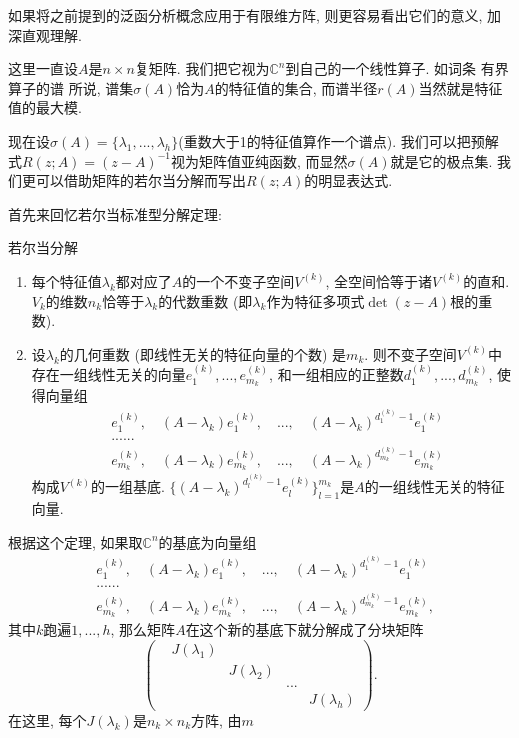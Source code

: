 

如果将之前提到的泛函分析概念应用于有限维方阵, 则更容易看出它们的意义, 加深直观理解. 

这里一直设$A$是$n\times n$复矩阵. 我们把它视为$\mathbb{C}^n$到自己的一个线性算子. 如词条 有界算子的谱 所说, 谱集$\sigma(A)$恰为$A$的特征值的集合, 而谱半径$r(A)$当然就是特征值的最大模. 

现在设$\sigma(A)=\{\lambda_1,...,\lambda_h\}$(重数大于1的特征值算作一个谱点). 我们可以把预解式$R(z;A)=(z-A)^{-1}$视为矩阵值亚纯函数, 而显然$\sigma(A)$就是它的极点集. 我们更可以借助矩阵的若尔当分解而写出$R(z;A)$的明显表达式. 

首先来回忆若尔当标准型分解定理:

\begin{theorem}{若尔当分解}
\begin{enumerate}
\item 每个特征值$\lambda_k$都对应了$A$的一个不变子空间$V^{(k)}$, 全空间恰等于诸$V^{(k)}$的直和. $V_k$的维数$n_k$恰等于$\lambda_k$的代数重数 (即$\lambda_k$作为特征多项式$\det(z-A)$根的重数).
\item 设$\lambda_k$的几何重数 (即线性无关的特征向量的个数) 是$m_k$. 则不变子空间$V^{(k)}$中存在一组线性无关的向量$e^{(k)}_1,...,e^{(k)}_{m_k}$, 和一组相应的正整数$d^{(k)}_1,...,d^{(k)}_{m_k}$, 使得向量组
$$
\begin{aligned}
&e^{(k)}_1,\quad(A-\lambda_k)e^{(k)}_1,\quad...,\quad(A-\lambda_k)^{d^{(k)}_1-1}e^{(k)}_1\\
&......\\
&e^{(k)}_{m_k},\quad(A-\lambda_k)e^{(k)}_{m_k},\quad...,\quad(A-\lambda_k)^{d^{(k)}_{m_k}-1}e^{(k)}_{m_k}
\end{aligned}
$$
构成$V^{(k)}$的一组基底. $\{(A-\lambda_k)^{d^{(k)}_l-1}e^{(k)}_l\}_{l=1}^{m_k}$是$A$的一组线性无关的特征向量.
\end{enumerate}
\end{theorem}

根据这个定理, 如果取$\mathbb{C}^n$的基底为向量组
$$
\begin{aligned}
&e^{(k)}_1,\quad(A-\lambda_k)e^{(k)}_1,\quad...,\quad(A-\lambda_k)^{d^{(k)}_1-1}e^{(k)}_1\\
&......\\
&e^{(k)}_{m_k},\quad(A-\lambda_k)e^{(k)}_{m_k},\quad...,\quad(A-\lambda_k)^{d^{(k)}_{m_k}-1}e^{(k)}_{m_k},
\end{aligned}
$$
其中$k$跑遍$1,...,h$, 那么矩阵$A$在这个新的基底下就分解成了分块矩阵
$$
\left(
\begin{matrix}
&J(\lambda_1) &  & & \\
& &J(\lambda_2) & & \\
& & &...\\
& & & & J(\lambda_h)
\end{matrix}
\right).
$$
在这里, 每个$J(\lambda_k)$是$n_k\times n_k$方阵, 由$m$
